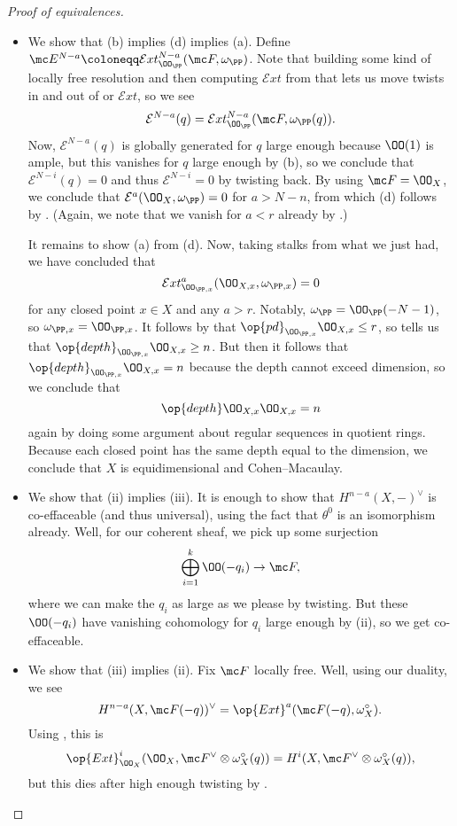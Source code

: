 \documentclass[../notes.tex]{subfiles}
\begin{document}
\begin{proof}[Proof of equivalences]
\begin{itemize}
		\item We show that (b) implies (d) implies (a). Define $\mc E^{N-a}\coloneqq\mathcal Ext^{N-a}_{\OO_\PP}(\mc F,\omega_\PP)$. Note that building some kind of locally free resolution and then computing $\mathcal Ext$ from that lets us move twists in and out of or $\mathcal Ext$, so we see
		\[\mathcal E^{N-a}(q)=\mathcal Ext^{N-a}_{\OO_\PP}(\mc F,\omega_\PP(q)).\]
		Now, $\mathcal E^{N-a}(q)$ is globally generated for $q$ large enough because $\OO(1)$ is ample, but this vanishes for $q$ large enough by (b), so we conclude that $\mathcal E^{N-i}(q)=0$ and thus $\mathcal E^{N-i}=0$ by twisting back. By using $\mc F=\OO_X$, we conclude that $\mathcal E^a(\OO_X,\omega_\PP)=0$ for $a>N-n$, from which (d) follows by . (Again, we note that we vanish for $a<r$ already by .)

		It remains to show (a) from (d). Now, taking stalks from what we just had, we have concluded that
		\[\mathcal Ext^a_{\OO_{\PP,x}}(\OO_{X,x},\omega_{\PP,x})=0\]
		for any closed point $x\in X$ and any $a>r$. Notably, $\omega_\PP=\OO_\PP(-N-1)$, so $\omega_{\PP,x}=\OO_{\PP,x}$. It follows by  that $\op{pd}_{\OO_{\PP,x}}\OO_{X,x}\le r$, so  tells us that $\op{depth}_{\OO_{\PP,x}}\OO_{X,x}\ge n$. But then it follows that $\op{depth}_{\OO_{\PP,x}}\OO_{X,x}=n$ because the depth cannot exceed dimension, so we conclude that
		\[\op{depth}\OO_{X,x}\OO_{X,x}=n\]
		again by doing some argument about regular sequences in quotient rings. Because each closed point has the same depth equal to the dimension, we conclude that $X$ is equidimensional and Cohen--Macaulay.

		\item We show that (ii) implies (iii). It is enough to show that $H^{n-a}(X,-)^\lor$ is co-effaceable (and thus universal), using the fact that $\theta^0$ is an isomorphism already. Well, for our coherent sheaf, we pick up some surjection
		\[\bigoplus_{i=1}^k\OO(-q_i)\to\mc F,\]
		where we can make the $q_i$ as large as we please by twisting. But these $\OO(-q_i)$ have vanishing cohomology for $q_i$ large enough by (ii), so we get co-effaceable.

		\item We show that (iii) implies (ii). Fix $\mc F$ locally free. Well, using our duality, we see
		\[H^{n-a}(X,\mc F(-q))^\lor=\op{Ext}^a(\mc F(-q),\omega_X^\circ).\]
		Using , this is
		\[\op{Ext}^i_{\OO_X}(\OO_X,\mc F^\lor\otimes\omega_X^\circ(q))=H^i(X,\mc F^\lor\otimes\omega^\circ_X(q)),\]
		but this dies after high enough twisting by .
		\qedhere
	\end{itemize}
\end{proof}
\end{document}
